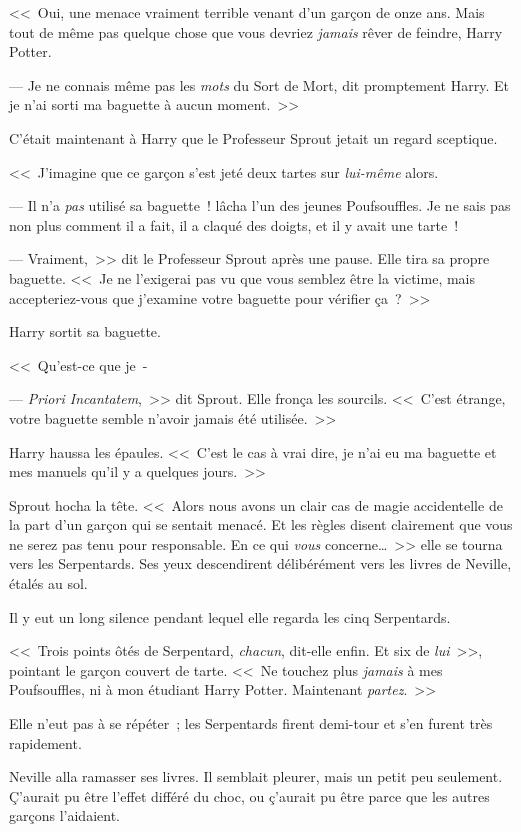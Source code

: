 <<~Oui, une menace vraiment terrible venant d'un garçon de onze ans. Mais tout de même pas quelque chose que vous devriez \emph{jamais} rêver de feindre, Harry Potter.

--- Je ne connais même pas les \emph{mots} du Sort de Mort, dit promptement Harry. Et je n'ai sorti ma baguette à aucun moment.~>>

C'était maintenant à Harry que le Professeur Sprout jetait un regard sceptique.

<<~J'imagine que ce garçon s'est jeté deux tartes sur \emph{lui-même} alors.

--- Il n'a \emph{pas} utilisé sa baguette~! lâcha l'un des jeunes Poufsouffles. Je ne sais pas non plus comment il a fait, il a claqué des doigts, et il y avait une tarte~!

--- Vraiment,~>> dit le Professeur Sprout après une pause. Elle tira sa propre baguette. <<~Je ne l'exigerai pas vu que vous semblez être la victime, mais accepteriez-vous que j'examine votre baguette pour vérifier ça~?~>>

Harry sortit sa baguette.

<<~Qu'est-ce que je~-

--- \emph{Priori Incantatem},~>> dit Sprout. Elle fronça les sourcils. <<~C'est étrange, votre baguette semble n'avoir jamais été utilisée.~>>

Harry haussa les épaules. <<~C'est le cas à vrai dire, je n'ai eu ma baguette et mes manuels qu'il y a quelques jours.~>>

Sprout hocha la tête. <<~Alors nous avons un clair cas de magie accidentelle de la part d'un garçon qui se sentait menacé. Et les règles disent clairement que vous ne serez pas tenu pour responsable. En ce qui \emph{vous} concerne…~>> elle se tourna vers les Serpentards. Ses yeux descendirent délibérément vers les livres de Neville, étalés au sol.

Il y eut un long silence pendant lequel elle regarda les cinq Serpentards.

<<~Trois points ôtés de Serpentard, \emph{chacun}, dit-elle enfin. Et six de \emph{lui}~>>, pointant le garçon couvert de tarte. <<~Ne touchez plus \emph{jamais} à mes Poufsouffles, ni à mon étudiant Harry Potter. Maintenant \emph{partez}.~>>

Elle n'eut pas à se répéter~; les Serpentards firent demi-tour et s'en furent très rapidement.

Neville alla ramasser ses livres. Il semblait pleurer, mais un petit peu seulement. Ç'aurait pu être l'effet différé du choc, ou ç'aurait pu être parce que les autres garçons l'aidaient.

